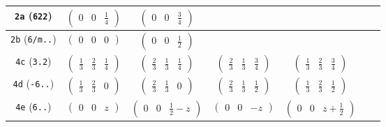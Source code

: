 \documentclass[fleqn,9pt,landscape]{jsarticle}
\begin{document}
\begin{center}
\begin{longtable}{ccccccc}
{\tt 2a} ({\tt 622}) & $ \begin{pmatrix} 0 & 0 & \frac{1}{4} \end{pmatrix} $ & $ \begin{pmatrix} 0 & 0 & \frac{3}{4} \end{pmatrix} $ & $  $ & $  $ & $  $ & $  $ \\ \hline
{\tt 2b} ({\tt 6/m..}) & $ \begin{pmatrix} 0 & 0 & 0 \end{pmatrix} $ & $ \begin{pmatrix} 0 & 0 & \frac{1}{2} \end{pmatrix} $ & $  $ & $  $ & $  $ & $  $ \\ \hline
{\tt 4c} ({\tt 3.2}) & $ \begin{pmatrix} \frac{1}{3} & \frac{2}{3} & \frac{1}{4} \end{pmatrix} $ & $ \begin{pmatrix} \frac{2}{3} & \frac{1}{3} & \frac{1}{4} \end{pmatrix} $ & $ \begin{pmatrix} \frac{2}{3} & \frac{1}{3} & \frac{3}{4} \end{pmatrix} $ & $ \begin{pmatrix} \frac{1}{3} & \frac{2}{3} & \frac{3}{4} \end{pmatrix} $ & $  $ & $  $ \\ \hline
{\tt 4d} ({\tt -6..}) & $ \begin{pmatrix} \frac{1}{3} & \frac{2}{3} & 0 \end{pmatrix} $ & $ \begin{pmatrix} \frac{2}{3} & \frac{1}{3} & 0 \end{pmatrix} $ & $ \begin{pmatrix} \frac{2}{3} & \frac{1}{3} & \frac{1}{2} \end{pmatrix} $ & $ \begin{pmatrix} \frac{1}{3} & \frac{2}{3} & \frac{1}{2} \end{pmatrix} $ & $  $ & $  $ \\ \hline
{\tt 4e} ({\tt 6..}) & $ \begin{pmatrix} 0 & 0 & z \end{pmatrix} $ & $ \begin{pmatrix} 0 & 0 & \frac{1}{2} - z \end{pmatrix} $ & $ \begin{pmatrix} 0 & 0 & - z \end{pmatrix} $ & $ \begin{pmatrix} 0 & 0 & z + \frac{1}{2} \end{pmatrix} $ & $  $ & $  $ \\ \hline

\end{longtable}
\end{center}
\end{document}
